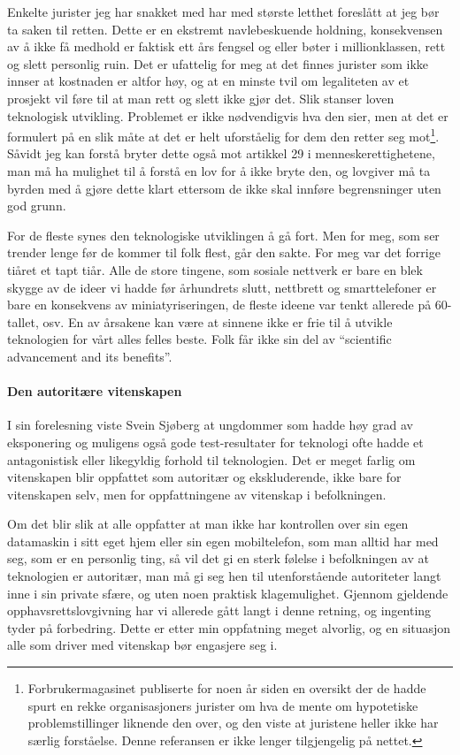 \documentclass[11pt,norsk,a4paper]{article}
\begin{document}
Enkelte jurister jeg har snakket med har med største letthet foreslått
at jeg bør ta saken til retten. Dette er en ekstremt navlebeskuende
holdning, konsekvensen av å ikke få medhold er faktisk ett års fengsel
og eller bøter i millionklassen, rett og slett personlig ruin. Det er
ufattelig for meg at det finnes jurister som ikke innser at kostnaden
er altfor høy, og at en minste tvil om legaliteten av et prosjekt vil
føre til at man rett og slett ikke gjør det. Slik stanser loven
teknologisk utvikling. Problemet er ikke nødvendigvis hva den sier,
men at det er formulert på en slik måte at det er helt uforståelig for
dem den retter seg mot\footnote{Forbrukermagasinet publiserte for noen
år siden en oversikt der de hadde spurt en rekke organisasjoners
jurister om hva de mente om hypotetiske problemstillinger liknende den
over, og den viste at juristene heller ikke har særlig
forståelse. Denne referansen er ikke lenger tilgjengelig på
nettet.}. Såvidt jeg kan forstå bryter dette også mot artikkel 29 i
menneskerettighetene, man må ha mulighet til å forstå en lov for å
ikke bryte den, og lovgiver må ta byrden med å gjøre dette klart
ettersom de ikke skal innføre begrensninger uten god grunn.

For de fleste synes den teknologiske utviklingen å gå fort. Men for
meg, som ser trender lenge før de kommer til folk flest, går den
sakte. For meg var det forrige tiåret et tapt tiår. Alle de store
tingene, som sosiale nettverk er bare en blek skygge av de ideer vi
hadde før århundrets slutt, nettbrett og smarttelefoner er bare en
konsekvens av miniatyriseringen, de fleste ideene var tenkt allerede
på 60-tallet, osv. En av årsakene kan være at sinnene ikke er frie til
å utvikle teknologien for vårt alles felles beste. Folk får ikke sin
del av ``scientific advancement and its benefits''.

\paragraph{Den autoritære vitenskapen}

I sin forelesning viste Svein Sjøberg at ungdommer som hadde høy grad
av eksponering og muligens også gode test-resultater for teknologi
ofte hadde et antagonistisk eller likegyldig forhold til
teknologien. Det er meget farlig om vitenskapen blir oppfattet som
autoritær og ekskluderende, ikke bare for vitenskapen selv, men for
oppfattningene av vitenskap i befolkningen. 

Om det blir slik at alle oppfatter at man ikke har kontrollen over sin
egen datamaskin i sitt eget hjem eller sin egen mobiltelefon, som man
alltid har med seg, som er en personlig ting, så vil det gi en sterk
følelse i befolkningen av at teknologien er autoritær, man må gi seg
hen til utenforstående autoriteter langt inne i sin private sfære, og
uten noen praktisk klagemulighet. Gjennom gjeldende
opphavsrettslovgivning har vi allerede gått langt i denne retning, og
ingenting tyder på forbedring. Dette er etter min oppfatning meget
alvorlig, og en situasjon alle som driver med vitenskap bør engasjere
seg i.
\end{document}
